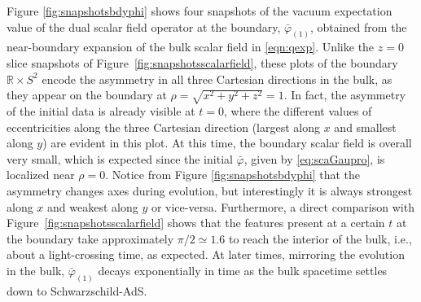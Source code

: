 \documentclass[a4paper,11pt]{article}
\numberwithin{equation}{section}
\begin{document}
Figure \ref{fig:snapshotsbdyphi} shows four snapshots of the vacuum expectation value of the dual scalar field operator at the boundary, $\bar{\varphi}_{(1)}$, obtained from  the near-boundary expansion of the bulk scalar field in \eqref{eqn:qexp}.
Unlike the $z=0$ slice snapshots of Figure~\ref{fig:snapshotsscalarfield}, these plots of the boundary $\mathbb{R}\times S^2$ encode the asymmetry in all three Cartesian directions in the bulk, as they appear on the boundary at $\rho = \sqrt{x^2+y^2+z^2}=1$. 
In fact, the asymmetry of the initial data is already visible at $t=0$, where the different values of eccentricities along the three Cartesian direction (largest along $x$ and smallest along $y$) are evident in this plot. At this time, the boundary scalar field is overall very small, which is expected since the initial $\bar{\varphi}$, given by \eqref{eq:scaGaupro}, is localized near $\rho=0$.
Notice from Figure \ref{fig:snapshotsbdyphi} that the asymmetry changes axes during evolution, but interestingly it is always strongest along $x$ and weakest along $y$ or vice-versa. Furthermore, a direct comparison with Figure~\ref{fig:snapshotsscalarfield} shows that the features present at a certain $t$ at the boundary take approximately $\pi/2\simeq1.6$ to reach the interior of the bulk, i.e., about a light-crossing time, as expected. At later times, mirroring the evolution in the bulk, $\bar{\varphi}_{(1)}$ decays exponentially in time as the bulk spacetime settles down to Schwarzschild-AdS.
\end{document}

